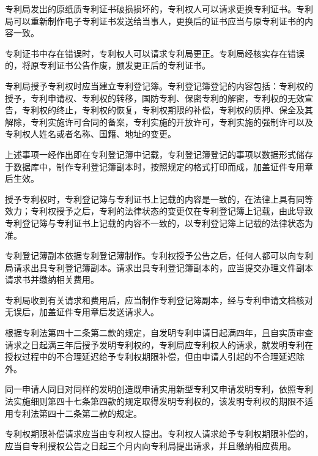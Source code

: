 专利局发出的原纸质专利证书破损损坏的，专利权人可以请求更换专利证书。专利局可以重新制作电子专利证书发送给当事人，更换后的证书应当与原专利证书的内容一致。

专利证书中存在错误时，专利权人可以请求专利局更正。专利局经核实存在错误的，将原专利证书公告作废，颁发更正后的专利证书。

专利局授予专利权时应当建立专利登记簿。专利登记簿登记的内容包括：专利权的授予，专利申请权、专利权的转移，国防专利、保密专利的解密，专利权的无效宣告，专利权的终止，专利权的恢复，专利权期限的补偿，专利权的质押、保全及其解除，专利实施许可合同的备案，专利实施的开放许可，专利实施的强制许可以及专利权人姓名或者名称、国籍、地址的变更。

上述事项一经作出即在专利登记簿中记载，专利登记簿登记的事项以数据形式储存于数据库中，制作专利登记簿副本时，按照规定的格式打印而成，加盖证件专用章后生效。

授予专利权时，专利登记簿与专利证书上记载的内容是一致的，在法律上具有同等效力；专利权授予之后，专利的法律状态的变更仅在专利登记簿上记载，由此导致专利登记簿与专利证书上记载的内容不一致的，以专利登记簿上记载的法律状态为准。

专利登记簿副本依据专利登记簿制作。专利权授予公告之后，任何人都可以向专利局请求出具专利登记簿副本。请求出具专利登记簿副本的，应当提交办理文件副本请求书并缴纳相关费用。

专利局收到有关请求和费用后，应当制作专利登记簿副本，经与专利申请文档核对无误后，加盖证件专用章后发送请求人。

根据专利法第四十二条第二款的规定，自发明专利申请日起满四年，且自实质审查请求之日起满三年后授予发明专利权的，专利局应专利权人的请求，就发明专利在授权过程中的不合理延迟给予专利权期限补偿，但由申请人引起的不合理延迟除外。

同一申请人同日对同样的发明创造既申请实用新型专利又申请发明专利，依照专利法实施细则第四十七条第四款的规定取得发明专利权的，该发明专利权的期限不适用专利法第四十二条第二款的规定。

专利权期限补偿请求应当由专利权人提出。专利权人请求给予专利权期限补偿的，应当自专利授权公告之日起三个月内向专利局提出请求，并且缴纳相应费用。

